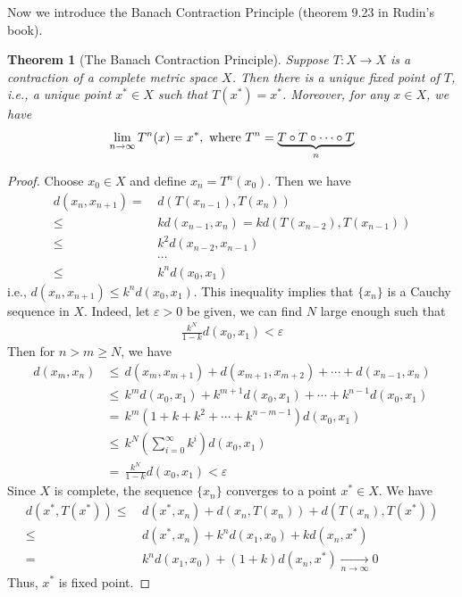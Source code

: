 \documentclass[12pt,leqno]{amsart}
\newtheorem{theorem}{Theorem}[section]
\theoremstyle{definition}
\numberwithin{equation}{subsection}
\begin{document}
Now we introduce the Banach Contraction Principle (theorem 9.23 in Rudin's book).
\begin{theorem}[The Banach Contraction Principle]
Suppose $T:X\to X$ is a contraction of a complete metric space $X$. Then there is a unique fixed point of $T$, i.e., a unique point $x^*\in X$ such that $T(x^*) = x^*$. Moreover, for any $x\in X$, we have 
\begin{align*}
    \lim_{n\to\infty} T^n(x) = x^*, \,\,{\rm where}\,\, T^n = \underbrace{T \circ T \circ\cdots\circ T}_{n}
\end{align*}
\end{theorem}
\begin{proof}
Choose $x_0\in X$ and define $x_n = T^n(x_0)$. Then we have
\begin{align*}
    d(x_n,x_{n+1}) = \,& d\left(T(x_{n-1}),T(x_n)\right) \\
    \leq \,& k d\left(x_{n-1},x_n\right) = k d\left(T(x_{n-2}),T(x_{n-1})\right) \\
    \leq \,& k^2 d\left(x_{n-2},x_{n-1}\right) \\
    & \cdots \\
    \leq \,& k^n d\left(x_{0},x_{1}\right)
\end{align*}
i.e., $d(x_n,x_{n+1}) \leq k^n d\left(x_{0},x_{1}\right)$. This inequality implies that $\{x_n\}$ is a Cauchy sequence in $X$. Indeed, let $\varepsilon > 0$ be given, we can find $N$ large enough such that 
\begin{align*}
    \frac{k^N}{1 - k} d\left(x_{0},x_{1}\right) < \varepsilon
\end{align*}
Then for $n > m \geq N$, we have
\begin{align*}
    d(x_m,x_n) &\leq \, d(x_m,x_{m+1}) + d(x_{m+1},x_{m+2}) + \cdots + d(x_{n-1},x_{n})\\
    &\leq \, k^m d(x_{0},x_{1}) + k^{m+1} d(x_{0},x_{1}) + \cdots + k^{n-1}d(x_{0},x_{1})\\
    &= \, k^m(1 + k + k^2 + \cdots + k^{n-m-1})d(x_{0},x_{1})\\
    &\leq \, k^N \left(\sum^\infty_{i=0}k^i\right)d(x_{0},x_{1}) \\
    &= \, \frac{k^N}{1 - k} d\left(x_{0},x_{1}\right) < \varepsilon
\end{align*}
Since $X$ is complete, the sequence $\{x_n\}$ converges to a point $x^*\in X$. We have
\begin{align*}
    d\left(x^*,T(x^*)\right) \leq &\,  d\left(x^*,x_n\right) + d\left(x_n,T(x_n)\right) + d\left(T(x_n),T(x^*)\right) \\
    \leq &\, d\left(x^*,x_n\right) + k^n d\left(x_1,x_0\right) + k d\left(x_n,x^*\right)\\
    = &\, k^n d\left(x_1,x_0\right) + (1+k) d\left(x_n,x^*\right) \xrightarrow[n\to\infty]{} 0
\end{align*}
Thus, $x^*$ is fixed point.


\end{proof}
\end{document}
